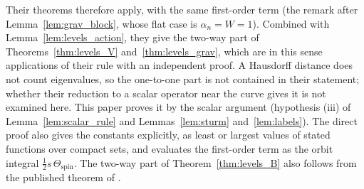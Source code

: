 \documentclass[aps,prd,onecolumn,tightenlines,nofootinbib,notitlepage,11pt,floatfix]{revtex4-2}
\theoremstyle{indentedtheorem}
\begin{document}
Their theorems therefore apply, with the same first-order term (the remark after Lemma~\ref{lem:grav_block}, whose flat case is $\alpha_n=W=1$). Combined with Lemma~\ref{lem:levels_action}, they give the two-way part of Theorems~\ref{thm:levels_V} and~\ref{thm:levels_grav}, which are in this sense applications of their rule with an independent proof. A Hausdorff distance does not count eigenvalues, so the one-to-one part is not contained in their statement; whether their reduction to a scalar operator near the curve gives it is not examined here. This paper proves it by the scalar argument (hypothesis (iii) of Lemma~\ref{lem:scalar_rule} and Lemmas~\ref{lem:sturm} and~\ref{lem:labels}). The direct proof also gives the constants explicitly, as least or largest values of stated functions over compact sets, and evaluates the first-order term as the orbit integral $\tfrac{1}{2}s\,\Theta_\text{spin}$. The two-way part of Theorem~\ref{thm:levels_B} also follows from the published theorem of \citet{IfaLouatiRouleux2017Bohr}.




\end{document}
